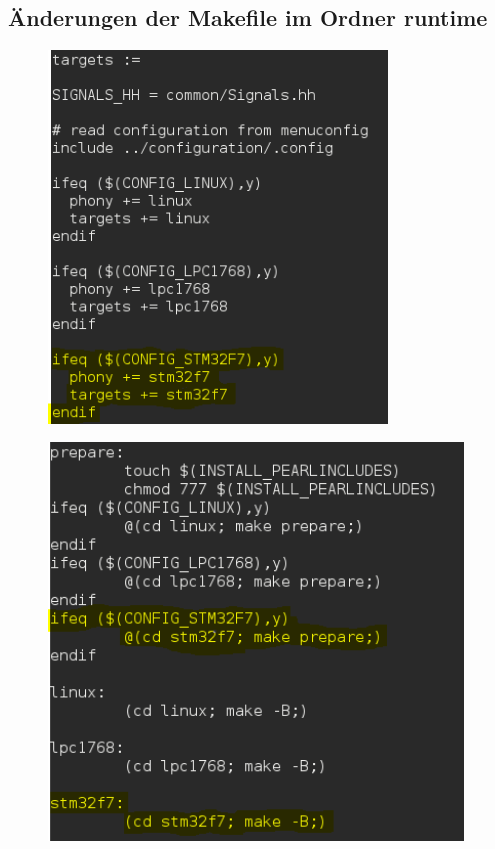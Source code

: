 \documentclass[12pt,a4paper]{article}
\begin{document}
\subsection{Änderungen der Makefile im Ordner runtime}\label{Änderungen der Makefile im Ordner runtime}
\begin{figure}[h]
\begin{center}
\includegraphics[width=9cm]{grafiken/Makefile_runtime1.png}
\end{center}
\end{figure}
\clearpage
\begin{figure}[h]
\begin{center}
\includegraphics[width=11cm]{grafiken/Makefile_runtime2.png}
\end{center}
\end{figure}
\end{document}
